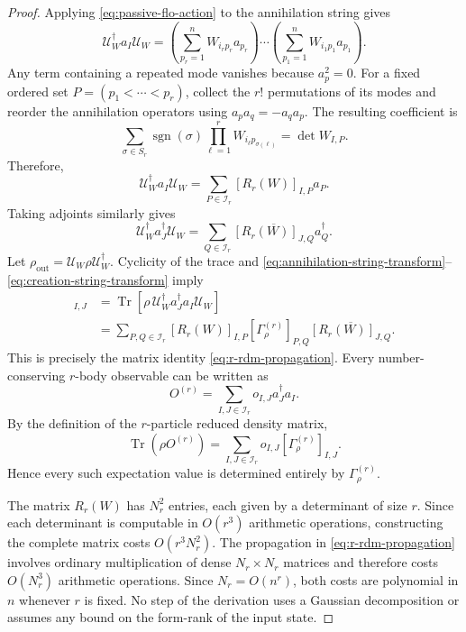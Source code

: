 \documentclass[10pt,twocolumn]{article}
\theoremstyle{plain}
\begin{document}
\begin{proof}
Applying \eqref{eq:passive-flo-action} to the annihilation string gives
\[
\mathcal U_W^\dagger a_I\mathcal U_W
=
\left(
\sum_{p_r=1}^n W_{i_rp_r}a_{p_r}
\right)
\cdots
\left(
\sum_{p_1=1}^n W_{i_1p_1}a_{p_1}
\right).
\]
Any term containing a repeated mode vanishes because \(a_p^2=0\).
For a fixed ordered set
\(P=(p_1<\cdots<p_r)\), collect the \(r!\) permutations of its modes
and reorder the annihilation operators using
\(a_pa_q=-a_qa_p\). The resulting coefficient is
\[
\sum_{\sigma\in S_r}
\operatorname{sgn}(\sigma)
\prod_{\ell=1}^r
W_{i_\ell p_{\sigma(\ell)}}
=
\det W_{I,P}.
\]
Therefore,
\begin{equation}
\mathcal U_W^\dagger a_I\mathcal U_W
=
\sum_{P\in\mathcal I_r}
[R_r(W)]_{I,P}a_P.
\label{eq:annihilation-string-transform}
\end{equation}
Taking adjoints similarly gives
\begin{equation}
\mathcal U_W^\dagger a_J^\dagger\mathcal U_W
=
\sum_{Q\in\mathcal I_r}
\overline{[R_r(W)]_{J,Q}}a_Q^\dagger.
\label{eq:creation-string-transform}
\end{equation}
Let
\(\rho_{\mathrm{out}}
=\mathcal U_W\rho\mathcal U_W^\dagger\).
Cyclicity of the trace and
\eqref{eq:annihilation-string-transform}--%
\eqref{eq:creation-string-transform} imply
\begin{align*}
[\Gamma_{\rho_{\mathrm{out}}}^{(r)}]_{I,J}
&=
\operatorname{Tr}\!\left[
\rho\,
\mathcal U_W^\dagger
a_J^\dagger a_I
\mathcal U_W
\right]
\\
&=
\sum_{P,Q\in\mathcal I_r}
[R_r(W)]_{I,P}
[\Gamma_\rho^{(r)}]_{P,Q}
\overline{[R_r(W)]_{J,Q}}.
\end{align*}
This is precisely the matrix identity
\eqref{eq:r-rdm-propagation}.
Every number-conserving \(r\)-body observable can be written as
\[
O^{(r)}
=
\sum_{I,J\in\mathcal I_r}
o_{I,J}a_J^\dagger a_I.
\]
By the definition of the \(r\)-particle reduced density matrix,
\[
\operatorname{Tr}\!\left(\rho O^{(r)}\right)
=
\sum_{I,J\in\mathcal I_r}
o_{I,J}
[\Gamma_\rho^{(r)}]_{I,J}.
\]
Hence every such expectation value is determined entirely by
\(\Gamma_\rho^{(r)}\).

The matrix \(R_r(W)\) has \(N_r^2\) entries, each given by a
determinant of size \(r\). Since each determinant is computable in
\(O(r^3)\) arithmetic operations, constructing the complete matrix
costs \(O(r^3N_r^2)\).
The propagation in \eqref{eq:r-rdm-propagation} involves ordinary
multiplication of dense \(N_r\times N_r\) matrices and therefore costs
\(O(N_r^3)\) arithmetic operations. Since \(N_r=O(n^r)\), both costs
are polynomial in \(n\) whenever \(r\) is fixed.
No step of the derivation uses a Gaussian decomposition or assumes any
bound on the form-rank of the input state.
\end{proof}
\end{document}
